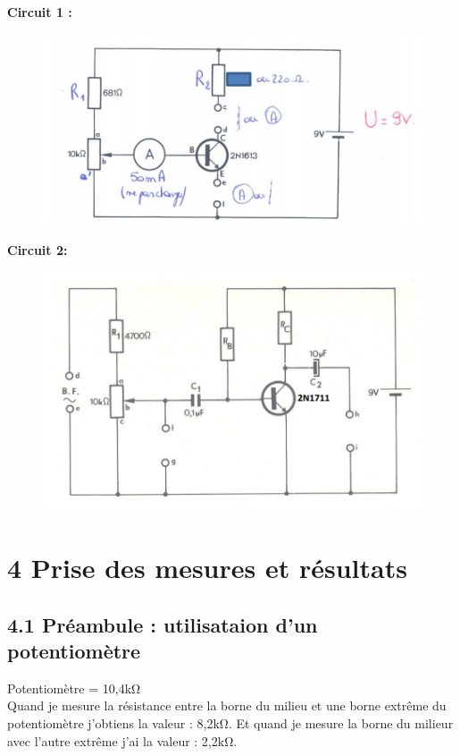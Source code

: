 \documentclass{report}
\begin{document}
\textbf{Circuit 1 : }
\begin{figure}[h!]
\centering
\includegraphics[scale=0.5]{Cir1.png}
\end{figure}

\textbf{Circuit 2: }
\begin{figure}[h!]
\centering
\includegraphics[scale=0.5]{Cir2.png}
\end{figure}



\section*{4 Prise des mesures et résultats}


\subsection*{4.1 Préambule : utilisataion d'un potentiomètre}
Potentiomètre = 10,4k$\si{\ohm}$\\
Quand je mesure la résistance entre la borne du milieu et une borne extrême du potentiomètre j'obtiens la valeur : 8,2k$\si{\ohm}$. Et quand je mesure la borne du milieur avec l'autre extrême j'ai la valeur : 2,2k$\si{\ohm}$.
\end{document}

